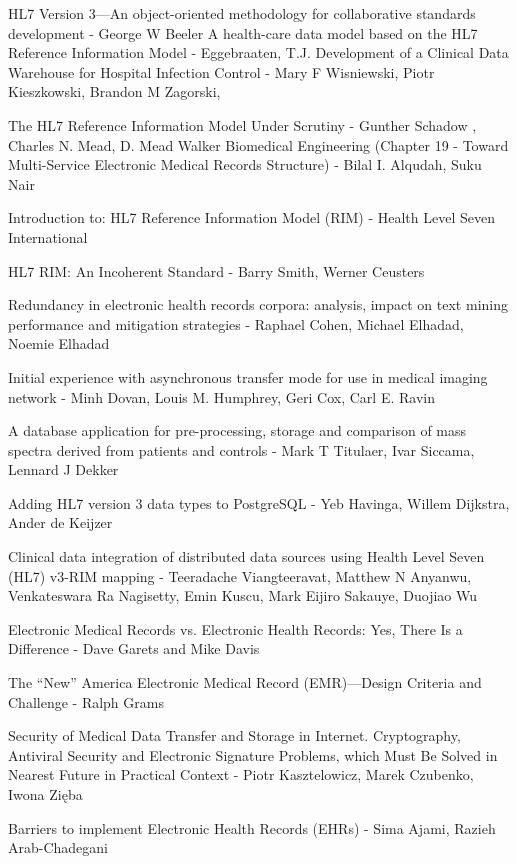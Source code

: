 \begin{thebibliography}{1}
HL7 Version 3—An object-oriented methodology for collaborative standards development - George W Beeler
A health-care data model based on the HL7 Reference Information Model - Eggebraaten, T.J.
Development of a Clinical Data Warehouse for Hospital Infection Control - Mary F Wisniewski, Piotr Kieszkowski, Brandon M Zagorski, 

The HL7 Reference Information Model Under Scrutiny - Gunther Schadow , Charles N. Mead, D. Mead Walker
Biomedical Engineering (Chapter 19 - Toward Multi-Service Electronic Medical Records Structure) - Bilal I. Alqudah, Suku Nair

Introduction to: HL7 Reference Information Model (RIM) - Health Level Seven International

HL7 RIM: An Incoherent Standard - Barry Smith, Werner Ceusters

Redundancy in electronic health records corpora: analysis, impact on text mining performance and mitigation strategies - Raphael Cohen, Michael Elhadad, Noemie Elhadad

Initial experience with asynchronous transfer mode for use in medical imaging network - Minh Dovan, Louis M. Humphrey, Geri Cox, Carl E. Ravin

A database application for pre-processing, storage and comparison of mass spectra derived  from patients and controls - Mark T Titulaer, Ivar Siccama, Lennard J Dekker

Adding HL7 version 3 data types to PostgreSQL - Yeb Havinga, Willem Dijkstra, Ander de Keijzer

Clinical data integration of distributed data sources using Health Level Seven (HL7) v3-RIM mapping - Teeradache Viangteeravat, Matthew N Anyanwu, Venkateswara Ra Nagisetty, Emin Kuscu, Mark Eijiro Sakauye, Duojiao Wu

Electronic Medical Records vs. Electronic Health Records: Yes, There Is a Difference - Dave Garets and Mike Davis

The “New” America Electronic Medical Record (EMR)—Design Criteria and Challenge - Ralph Grams

Security of Medical Data Transfer and Storage in Internet. Cryptography, Antiviral Security and Electronic Signature Problems, which Must Be Solved in Nearest Future in Practical Context - Piotr Kasztelowicz, Marek Czubenko, Iwona Zięba

Barriers to implement Electronic Health Records (EHRs) - Sima Ajami, Razieh Arab-Chadegani

\end{thebibliography}